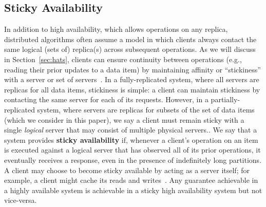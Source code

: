 \subsection{Sticky Availability}

In addition to high availability, which allows operations on any
replica, distributed algorithms often assume a model in which clients
always contact the same logical (sets of) replica(s) across subsequent
operations. As we will discuss in Section~\ref{sec:hats}, clients can
ensure continuity between operations (e.g., reading their prior
updates to a data item) by maintaining affinity or ``stickiness'' with
a server or set of servers~\cite{vogels-defs}. In a fully-replicated
system, where all servers are replicas for all data items, stickiness
is simple: a client can maintain stickiness by contacting the same
server for each of its requests. However, in a partially-replicated
system, where servers are replicas for subsets of the set of data
items (which we consider in this paper), we say a client must remain
sticky with a single \textit{logical} server that may consist of
multiple physical servers.. We say that a system provides
\textbf{sticky availability} if, whenever a client's operation on an
item is executed against a logical server that has observed all of its
prior operations, it eventually receives a response, even in the
presence of indefinitely long partitions. A client may choose to
become sticky available by acting as a server itself; for example, a
client might cache its reads and writes~\cite{bolton,
  sessionguarantees, swift}. Any guarantee achievable in a highly
available system is achievable in a sticky high availability system
but not vice-versa.


